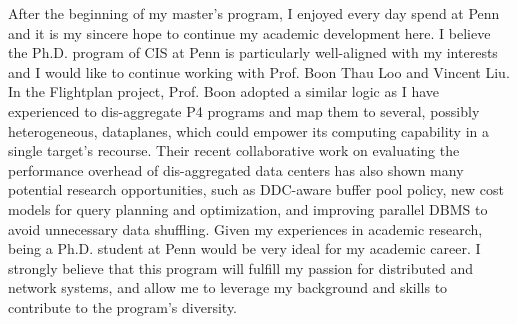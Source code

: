 \documentclass[12pt]{article}
\begin{document}
After the beginning of my master's program, I enjoyed every day spend at Penn
and it is my sincere hope to continue my academic development here. I believe
the Ph.D. program of CIS at Penn is particularly well-aligned with my interests
and I would like to continue working with Prof. Boon Thau Loo and Vincent Liu.
In the Flightplan project, Prof. Boon adopted a similar logic as I have
experienced to dis-aggregate P4 programs and map them to several, possibly
heterogeneous, dataplanes, which could empower its computing capability in a
single target's recourse. Their recent collaborative work on evaluating the
performance overhead of dis-aggregated data centers has also shown many
potential research opportunities, such as DDC-aware buffer pool policy, new cost
models for query planning and optimization, and improving parallel DBMS to avoid
unnecessary data shuffling. Given my experiences in academic research, being a
Ph.D. student at Penn would be very ideal for my academic career. I strongly
believe that this program will fulfill my passion for distributed and network
systems, and allow me to leverage my background and skills to contribute to the
program's diversity.
\end{document}
